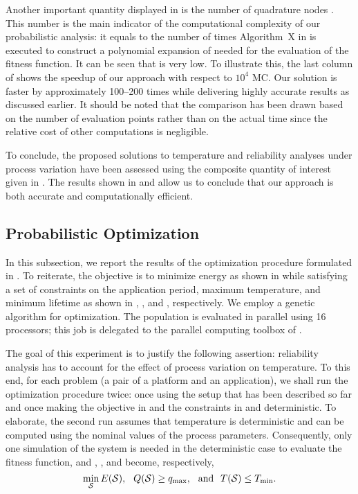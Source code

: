 Another important quantity displayed in  is the number of quadrature
nodes \nq. This number is the main indicator of the computational complexity of
our probabilistic analysis: it equals to the number of times Algorithm~X in
 is executed to construct a polynomial expansion of
 needed for the evaluation of the fitness function.
It can be seen that \nq is very low. To illustrate this, the last column of
 shows the speedup of our approach with respect to $10^4$ \ac{MC}.
Our solution is faster by approximately 100--200 times while delivering highly
accurate results as discussed earlier. It should be noted that the comparison
has been drawn based on the number of evaluation points rather than on the
actual time since the relative cost of other computations is negligible.

To conclude, the proposed solutions to temperature and reliability analyses
under process variation have been assessed using the composite quantity of
interest given in . The results shown in
 and  allow us to conclude that our approach is both
accurate and computationally efficient.

\subsection{Probabilistic Optimization}

In this subsection, we report the results of the optimization procedure
formulated in . To reiterate, the objective is to
minimize energy as shown in  while satisfying a set of
constraints on the application period, maximum temperature, and minimum lifetime
as shown in , , and
, respectively. We employ a genetic algorithm for
optimization. The population is evaluated in parallel using 16 processors; this
job is delegated to the parallel computing toolbox of  \cite{matlab}.

The goal of this experiment is to justify the following assertion: reliability
analysis has to account for the effect of process variation on temperature. To
this end, for each problem (a pair of a platform and an application), we shall
run the optimization procedure twice: once using the setup that has been
described so far and once making the objective in  and the
constraints in  and 
deterministic. To elaborate, the second run assumes that temperature is
deterministic and can be computed using the nominal values of the process
parameters. Consequently, only one simulation of the system is needed in the
deterministic case to evaluate the fitness function, and ,
, and  become,
respectively,
\[
  \min_{\mathcal{S}} E(\mathcal{S}), \hspace{0.7em}
  Q(\mathcal{S}) \geq q_{\mathrm{max}}, \hspace{0.7em} \text{and} \hspace{0.7em}
  T(\mathcal{S}) \leq T_{\mathrm{min}}.
\]

